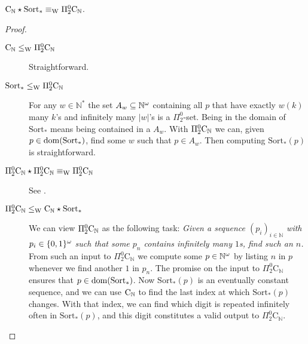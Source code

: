 \documentclass{eptcs-modified}
\begin{document}
\begin{proposition}
$\textrm{C}_\mathbb{N} \star \mathrm{Sort}_* \equiv_{\textrm{W}} \Pi^0_2\mathrm{C}_\mathbb{N}$.
\begin{proof}
\begin{description}
\item[$\textrm{C}_\mathbb{N} \leq_{\textrm{W}} \Pi^0_2\textrm{C}_\mathbb{N}$] Straightforward.
\item[$\mathrm{Sort}_* \leq_{\textrm{W}} \Pi^0_2\textrm{C}_\mathbb{N}$] For any $w \in \mathbb{N}^*$ the set $A_w \subseteq {\mathbb{N}^\omega}$ containing all $p$ that have exactly $w(k)$ many $k$'s and infinitely many $|w|$'s is a $\Pi^0_2$-set. Being in the domain of $\mathrm{Sort}_*$ means being contained in a $A_w$. With $\Pi^0_2\textrm{C}_\mathbb{N}$ we can, given $p \in \operatorname{dom}(\mathrm{Sort}_*)$, find some $w$ such that $p \in A_w$. Then computing $\mathrm{Sort}_*(p)$ is straightforward.
\item[$\Pi^0_2\mathrm{C}_\mathbb{N} \star \Pi^0_2\mathrm{C}_\mathbb{N} \equiv_{\textrm{W}} \Pi^0_2\mathrm{C}_\mathbb{N}$] See \cite{paulybrattka5}.
\item[$\Pi^0_2\mathrm{C}_\mathbb{N} \leq_{\textrm{W}} \textrm{C}_\mathbb{N} \star \mathrm{Sort}_*$] We can view $\Pi^0_2\textrm{C}_\mathbb{N}$ as the following task: \emph{Given a sequence $(p_i)_{i \in \mathbb{N}}$ with $p_i \in {\{0,1\}^\omega}$ such that some $p_n$ contains infinitely many $1$s, find such an $n$.} From such an input to $\Pi^0_2\mathrm{C}_\mathbb{N}$ we compute some $p \in {\mathbb{N}^\omega}$ by listing $n$ in $p$ whenever we find another $1$ in $p_n$. The promise on the input to $\Pi^0_2\mathrm{C}_\mathbb{N}$ ensures that $p \in \operatorname{dom}(\mathrm{Sort}_*)$. Now $\mathrm{Sort}_*(p)$ is an eventually constant sequence, and we can use $\textrm{C}_\mathbb{N}$ to find the last index at which $\mathrm{Sort}_*(p)$ changes. With that index, we can find which digit is repeated infinitely often in $\mathrm{Sort}_*(p)$, and this digit constitutes a valid output to $\Pi^0_2\mathrm{C}_\mathbb{N}$.
    \end{description}
\end{proof}
\end{proposition}
\end{document}
